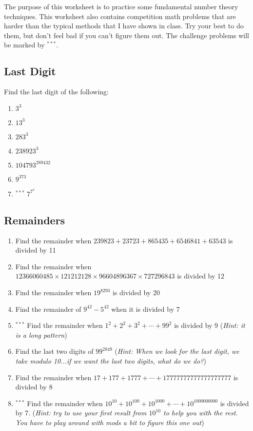 The purpose of this worksheet is to practice some fundamental number theory techniques. This worksheet also contains competition math problems that are harder than the typical methods that I have shown in class. Try your best to do them, but don't feel bad if you can't figure them out. The challenge problems will be marked by $^{\ast\ast\ast}$.

\subsection{Last Digit}
Find the last digit of the following:
\begin{enumerate}
    \item $3^3$
    \item $13^3$
    \item $283^3$
    \item $238923^3$
    \item $104793^{289432}$
    \item $9^{373}$
    \item $^{\ast\ast\ast}$ $7^{7^7}$
\end{enumerate}

\subsection{Remainders}
\begin{enumerate}
    \item Find the remainder when $239823+23723+865435+6546841+63543$ is divided by 11
    \item Find the remainder when $12366060485 \times 121212128 \times 96604896367 \times 727296843$ is divided by 12
    \item Find the remainder when $19^{8293}$ is divided by 20
    \item Find the remainder of $9^{42}-5^{42}$ when it is divided by 7
    \item $^{\ast\ast\ast}$ Find the remainder when $1^2+2^2+3^2+\cdots+99^2$ is divided by 9 (\textit{Hint: it is a long pattern})
    \item Find the last two digits of $99^{2849}$ (\textit{Hint: When we look for the last digit, we take modulo 10...if we want the last two digits, what do we do?})
    \item Find the remainder when $17+177+1777+\cdots+17777777777777777777$ is divided by 8
    \item $^{\ast\ast\ast}$ Find the remainder when $10^{10}+10^{100}+10^{1000}+\cdots+10^{1000000000}$ is divided by 7. (\textit{Hint: try to use your first result from $10^{10}$ to help you with the rest. You have to play around with mods a bit to figure this one out})
\end{enumerate}

